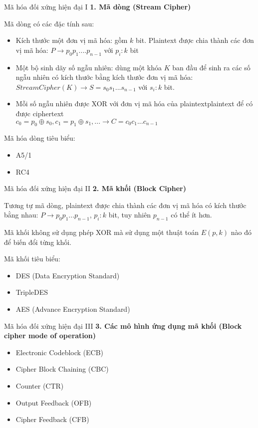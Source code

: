 \begin{frame}{Mã hóa đối xứng hiện đại I}
\textbf{1. Mã dòng (Stream Cipher)}

Mã dòng có các đặc tính sau:
\begin{itemize}
\item Kích thước một đơn vị mã hóa: gồm $k$ bit. Plaintext được chia thành các đơn vị mã hóa: $P \rightarrow p_0 p_1 .... p_{n-1}$ với $p_i: k$ bit
\item Một bộ sinh dãy số ngẫu nhiên: dùng một khóa $K$ ban đầu để sinh ra các số ngẫu nhiên có kích thước bằng kích thước đơn vị mã hóa: \\ $StreamCipher(K) \rightarrow S = s_0 s_1 ... s_{n-1}$ với $s_i: k$ bit.
\item Mỗi số ngẫu nhiên được XOR với đơn vị mã hóa của plaintextplaintext để có được ciphertext \\ $c_0 = p_0 \oplus s_0, c_1 = p_1 \oplus s_1, ... \rightarrow C = c_0 c_1 ... c_{n-1}$
\end{itemize}
Mã hóa dòng tiêu biểu: 
\begin{itemize}
    \item A5/1
    \item RC4
\end{itemize}
\end{frame}

\begin{frame}{Mã hóa đối xứng hiện đại II}
\textbf{2. Mã khối (Block Cipher)}

Tương tự mã dòng, plaintext được chia thành các đơn vị mã hóa có kích thước bằng nhau: $P \rightarrow p_0 p_1 ... p_{n-1}$, $p_i: k$ bit, tuy nhiên $p_{n-1}$ có thể ít hơn.

Mã khối không sử dụng phép XOR mà sử dụng một thuật toán $E(p, k)$ nào đó để biến đổi từng khối.

Mã khối tiêu biểu:
\begin{itemize}
    \item DES (Data Encryption Standard)
    \item TripleDES
    \item AES (Advance Encryption Standard)
\end{itemize}
\end{frame}

\begin{frame}{Mã hóa đối xứng hiện đại III}
\textbf{3. Các mô hình ứng dụng mã khối (Block cipher mode of operation)}

\begin{itemize}
    \item Electronic Codeblock (ECB)
    \item Cipher Block Chaining (CBC)
    \item Counter (CTR)
    \item Output Feedback (OFB)
    \item Cipher Feedback (CFB)
\end{itemize}
\end{frame}

